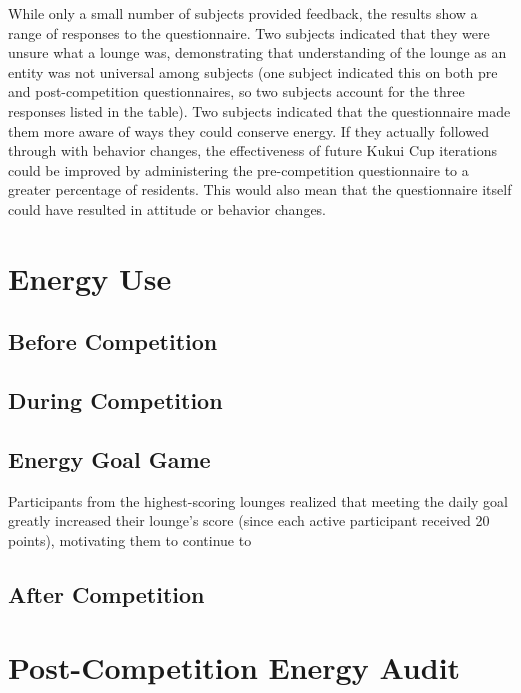 While only a small number of subjects provided feedback, the results show a range of responses to the questionnaire. Two subjects indicated that they were unsure what a lounge was, demonstrating that understanding of the lounge as an entity was not universal among subjects (one subject indicated this on both pre and post-competition questionnaires, so two subjects account for the three responses listed in the table). Two subjects indicated that the questionnaire made them more aware of ways they could conserve energy. If they actually followed through with behavior changes, the effectiveness of future Kukui Cup iterations could be improved by administering the pre-competition questionnaire to a greater percentage of residents. This would also mean that the questionnaire itself could have resulted in attitude or behavior changes.

\section{Energy Use}


\subsection{Before Competition}


\subsection{During Competition}

\subsection{Energy Goal Game}

Participants from the highest-scoring lounges realized that meeting the daily goal greatly increased their lounge's score (since each active participant received 20 points), motivating them to continue to 

\subsection{After Competition}








\section{Post-Competition Energy Audit}
\label{sec:post-energy-audit}

